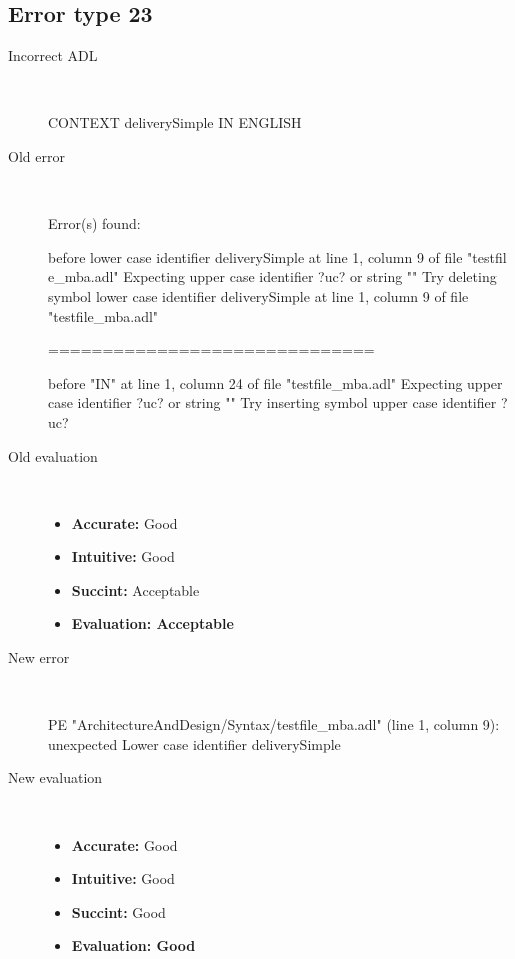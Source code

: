 \hrulefill

\subsection{Error type 23}
  \begin{description}
  \item[Incorrect ADL]~\\
\begin{adl}
CONTEXT deliverySimple IN ENGLISH\end{adl}
  \item[Old error]~\\
\begin{haskell}
Error(s) found:

before lower case identifier deliverySimple at line 1, column 9 of file "testfil
e_mba.adl"
Expecting upper case identifier ?uc? or string ""
Try deleting symbol lower case identifier deliverySimple at line 1, column 9 of
file "testfile_mba.adl"

==============================

before "IN" at line 1, column 24 of file "testfile_mba.adl"
Expecting upper case identifier ?uc? or string ""
Try inserting symbol upper case identifier ?uc?\end{haskell}
  \item[Old evaluation]~\\
    \begin{itemize}
    \item \textbf{Accurate:} Good
    \item \textbf{Intuitive:} Good
    \item \textbf{Succint:} Acceptable
    \item \textbf{Evaluation: Acceptable}
    \end{itemize}
  \item[New error]~\\
\begin{haskell}
PE "ArchitectureAndDesign/Syntax/testfile_mba.adl" (line 1, column 9):
unexpected Lower case identifier deliverySimple\end{haskell}
  \item[New evaluation]~\\
    \begin{itemize}
    \item \textbf{Accurate:} Good
    \item \textbf{Intuitive:} Good
    \item \textbf{Succint:} Good
    \item \textbf{Evaluation: Good
}
    \end{itemize}
  \end{description}

